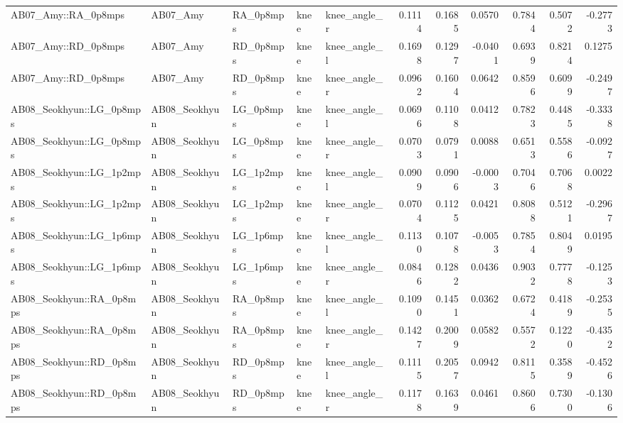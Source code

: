 \begin{table}
\begin{tabular}{lllllrrrrrr}
AB07_Amy::RA_0p8mps & AB07_Amy & RA_0p8mps & knee & knee_angle_r & 0.1114 & 0.1685 & 0.0570 & 0.7844 & 0.5072 & -0.2773 \\
AB07_Amy::RD_0p8mps & AB07_Amy & RD_0p8mps & knee & knee_angle_l & 0.1698 & 0.1297 & -0.0401 & 0.6939 & 0.8214 & 0.1275 \\
AB07_Amy::RD_0p8mps & AB07_Amy & RD_0p8mps & knee & knee_angle_r & 0.0962 & 0.1604 & 0.0642 & 0.8596 & 0.6099 & -0.2497 \\
AB08_Seokhyun::LG_0p8mps & AB08_Seokhyun & LG_0p8mps & knee & knee_angle_l & 0.0696 & 0.1108 & 0.0412 & 0.7823 & 0.4485 & -0.3338 \\
AB08_Seokhyun::LG_0p8mps & AB08_Seokhyun & LG_0p8mps & knee & knee_angle_r & 0.0703 & 0.0791 & 0.0088 & 0.6513 & 0.5586 & -0.0927 \\
AB08_Seokhyun::LG_1p2mps & AB08_Seokhyun & LG_1p2mps & knee & knee_angle_l & 0.0909 & 0.0906 & -0.0003 & 0.7046 & 0.7068 & 0.0022 \\
AB08_Seokhyun::LG_1p2mps & AB08_Seokhyun & LG_1p2mps & knee & knee_angle_r & 0.0704 & 0.1125 & 0.0421 & 0.8088 & 0.5121 & -0.2967 \\
AB08_Seokhyun::LG_1p6mps & AB08_Seokhyun & LG_1p6mps & knee & knee_angle_l & 0.1130 & 0.1078 & -0.0053 & 0.7854 & 0.8049 & 0.0195 \\
AB08_Seokhyun::LG_1p6mps & AB08_Seokhyun & LG_1p6mps & knee & knee_angle_r & 0.0846 & 0.1282 & 0.0436 & 0.9032 & 0.7778 & -0.1253 \\
AB08_Seokhyun::RA_0p8mps & AB08_Seokhyun & RA_0p8mps & knee & knee_angle_l & 0.1090 & 0.1451 & 0.0362 & 0.6724 & 0.4189 & -0.2535 \\
AB08_Seokhyun::RA_0p8mps & AB08_Seokhyun & RA_0p8mps & knee & knee_angle_r & 0.1427 & 0.2009 & 0.0582 & 0.5572 & 0.1220 & -0.4352 \\
AB08_Seokhyun::RD_0p8mps & AB08_Seokhyun & RD_0p8mps & knee & knee_angle_l & 0.1115 & 0.2057 & 0.0942 & 0.8115 & 0.3589 & -0.4526 \\
AB08_Seokhyun::RD_0p8mps & AB08_Seokhyun & RD_0p8mps & knee & knee_angle_r & 0.1178 & 0.1639 & 0.0461 & 0.8606 & 0.7300 & -0.1306 \\
\bottomrule
\end{tabular}
\end{table}
